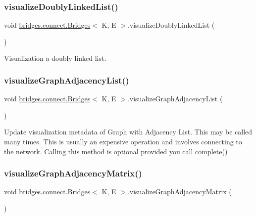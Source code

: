 \subsubsection{\texorpdfstring{visualize\+Doubly\+Linked\+List()}{visualizeDoublyLinkedList()}}
{\footnotesize\ttfamily void \hyperlink{classbridges_1_1connect_1_1_bridges}{bridges.\+connect.\+Bridges}$<$ K, E $>$.visualize\+Doubly\+Linked\+List (\begin{DoxyParamCaption}{ }\end{DoxyParamCaption})\hspace{0.3cm}{\ttfamily [protected]}}

Visualization a doubly linked list. \hypertarget{classbridges_1_1connect_1_1_bridges_a7470f7a358eee6a6cded3ab42f8b9cdc}{}\label{classbridges_1_1connect_1_1_bridges_a7470f7a358eee6a6cded3ab42f8b9cdc} 
\subsubsection{\texorpdfstring{visualize\+Graph\+Adjacency\+List()}{visualizeGraphAdjacencyList()}}
{\footnotesize\ttfamily void \hyperlink{classbridges_1_1connect_1_1_bridges}{bridges.\+connect.\+Bridges}$<$ K, E $>$.visualize\+Graph\+Adjacency\+List (\begin{DoxyParamCaption}{ }\end{DoxyParamCaption})\hspace{0.3cm}{\ttfamily [protected]}}

Update visualization metadata of Graph with Adjacency List. This may be called many times. This is usually an expensive operation and involves connecting to the network. Calling this method is optional provided you call complete() \hypertarget{classbridges_1_1connect_1_1_bridges_a13c154c2a656dd4c19f2ff0e767f63c3}{}\label{classbridges_1_1connect_1_1_bridges_a13c154c2a656dd4c19f2ff0e767f63c3} 
\subsubsection{\texorpdfstring{visualize\+Graph\+Adjacency\+Matrix()}{visualizeGraphAdjacencyMatrix()}}
{\footnotesize\ttfamily void \hyperlink{classbridges_1_1connect_1_1_bridges}{bridges.\+connect.\+Bridges}$<$ K, E $>$.visualize\+Graph\+Adjacency\+Matrix (\begin{DoxyParamCaption}{ }\end{DoxyParamCaption})\hspace{0.3cm}{\ttfamily [protected]}}

